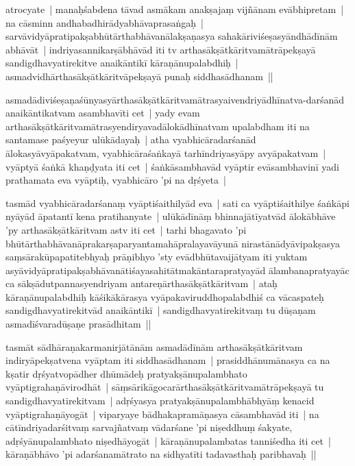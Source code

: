 \documentclass[article,12pt,a4paper]{memoir}%
\newcounter{parCount}
\begin{document}
	  
	  \pstart \leavevmode%
	\label{thakur75-17.23}atrocyate | manaḥśabdena tāvad asmākam anakṣajaṃ vijñānam evābhipretam | na cāsminn andhabadhirādyabhāvaprasaṅgaḥ | sarvāvidyāpratipakṣabhūtārthabhāvanālakṣaṇasya sahakāriviśeṣasyāndhādīnām abhāvāt | indriyasannikarṣābhāvād iti tv arthasākṣātkāritvamātrāpekṣayā sandigdhavyatirekitve anaikāntikī kāraṇānupalabdhiḥ | asmadvidhārthasākṣātkāritvāpekṣayā punaḥ siddhasādhanam || 
	{}
	\pend%
      

	  
	  \pstart \leavevmode%
	\label{thakur75-17.28}asmadādiviśeṣaṇaśūnyasyārthasākṣātkāritvamātrasyaivendriyādhīnatva-darśanād anaikāntikatvam asambhavīti cet | yady evam arthasākṣātkāritvamātrasyendiryavadālokādhīnatvam upalabdham iti na santamase paśyeyur ulūkādayaḥ | atha vyabhicāradarśanād ālokasyāvyāpakatvam, vyabhicāraśaṅkayā tarhīndriyasyāpy avyāpakatvam | vyāptyā śaṅkā khaṇḍyata iti cet | śaṅkāsambhavād vyāptir evāsambhavinī yadi prathamata eva vyāptiḥ, vyabhicāro 'pi na dṛśyeta | 
	{}
	\pend%
      

	  
	  \pstart \leavevmode%
	\label{thakur75-18.1}tasmād vyabhicāradarśanaṃ vyāptiśaithilyād eva | sati ca vyāptiśaithilye śaṅkāpi nyāyād āpatantī kena pratihanyate | ulūkādīnāṃ bhinnajātīyatvād ālokābhāve 'py arthasākṣātkāritvam astv iti cet | tarhi bhagavato 'pi bhūtārthabhāvanāprakarṣaparyantamahāpralayavāyunā nirastānādyāvipakṣasya saṃsārakūpapatitebhyaḥ prāṇibhyo 'sty evādbhūtavaijātyam iti yuktam asyāvidyāpratipakṣabhāvanātiśayasahitātmakāntarapratyayād ālambanapratyayāc ca sākṣādutpannasyendriyam antareṇārthasākṣātkāritvam | ataḥ kāraṇānupalabdhiḥ kāśikākārasya vyāpakaviruddhopalabdhiś ca vācaspateḥ sandigdhavyatirekitvād anaikāntikī | sandigdhavyatirekitvaṃ tu dūṣaṇam asmadīśvaradūṣaṇe prasādhitam || 
	{}
	\pend%
      

	  
	  \pstart \leavevmode%
	\label{thakur75-18.10}tasmāt sādhāraṇakarmanirjātānām asmadādīnām arthasākṣātkāritvam indiryāpekṣatvena vyāptam iti siddhasādhanam | prasiddhānumānasya ca na kṣatir dṛśyatvopādher dhūmādeḥ pratyakṣānupalambhato vyāptigrahaṇāvirodhāt | sāṃsārikāgocarārthasākṣātkāritvamātrāpekṣayā tu sandigdhavyatirekitvam | adṛśyasya pratyakṣānupalambhābhyāṃ kenacid vyāptigrahaṇāyogāt | viparyaye bādhakapramāṇasya cāsambhavād iti | na cātīndriyadarśitvaṃ sarvajñatvaṃ vādarśane 'pi niṣeddhuṃ śakyate, adṛśyānupalambhato niṣedhāyogāt | kāraṇānupalambatas tanniśedha iti cet | kāraṇābhāvo 'pi adarśanamātrato na sidhyatīti tadavasthaḥ paribhavaḥ || 
	{}
	\pend%
      
\end{document}
